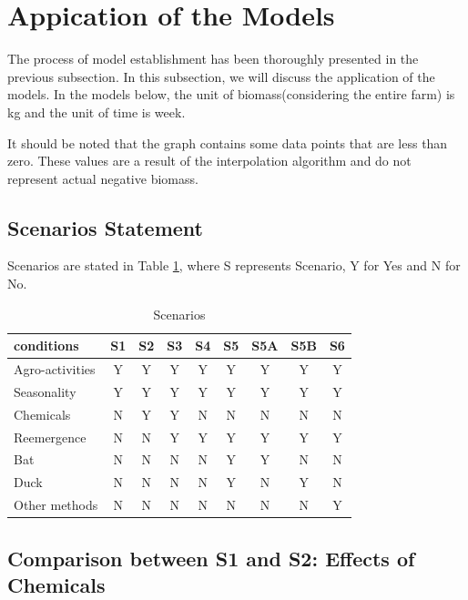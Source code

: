 \documentclass{HZNUMCM}
\begin{document}
  \section{Appication of the Models}
    The process of model establishment has been thoroughly presented in the previous subsection. 
    In this subsection, we will discuss the application of the models.
    In the models below, the unit of biomass(considering the entire farm) is kg and the unit of time is week.
        
    It should be noted that the graph contains some data points that are less than zero. 
    These values are a result of the interpolation algorithm and do not represent actual negative biomass. 
        
      
      \subsection{Scenarios Statement}
        Scenarios are stated in Table \ref{tab:Scenarios}, where S represents Scenario, Y for Yes and N for No.

        \begin{table}[H]
          \centering
          \caption{Scenarios}
          \begin{tabular}{lcccccccc}
            \toprule
            \rowcolor{customcolor!40} %
            conditions & S1 & S2 & S3 & S4 & S5 & S5A & S5B & S6 \\
            \midrule
            Agro-activities & Y & Y & Y & Y & Y & Y & Y & Y \\
            Seasonality & Y & Y & Y & Y & Y & Y & Y & Y \\
            Chemicals & N & Y & Y & N & N & N & N & N \\
            Reemergence & N & N & Y & Y & Y & Y & Y & Y \\
            Bat & N & N & N & N & Y & Y & N & N \\
            Duck & N & N & N & N & Y & N & Y & N \\
            Other methods & N & N & N & N & N & N & N & Y \\

            \bottomrule
          \end{tabular}
          \label{tab:Scenarios}
        \end{table}
      \subsection{Comparison between S1 and S2: Effects of Chemicals}
\end{document}
